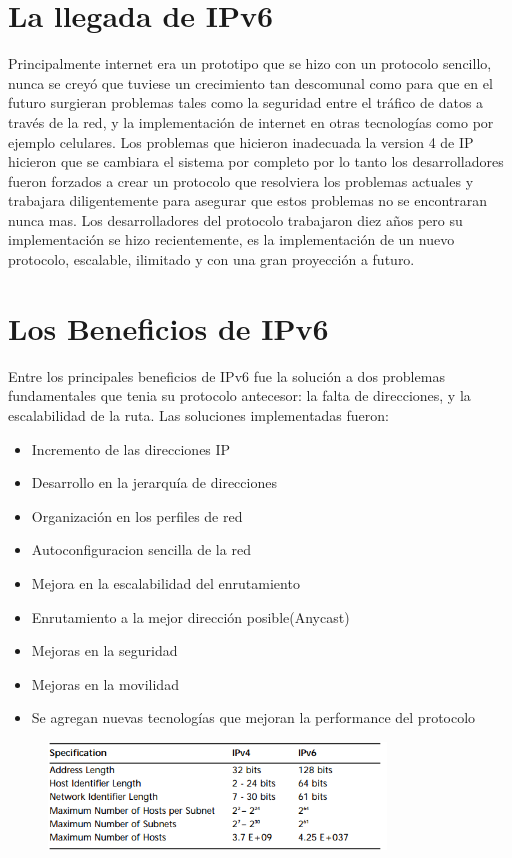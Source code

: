 \documentclass[11pt,a4paper]{article}
\begin{document}
\section{La llegada de IPv6}
Principalmente internet era un prototipo que se hizo con un protocolo sencillo, nunca se creyó que 
tuviese un crecimiento tan descomunal como para que en el futuro surgieran problemas tales como la 
seguridad entre el tráfico de datos a través de la red, y la implementación de internet en otras 
tecnologías como por ejemplo celulares. Los problemas que hicieron inadecuada la version 4 de IP 
hicieron que se cambiara el sistema por completo por lo tanto los desarrolladores fueron forzados a 
crear un protocolo que resolviera los problemas actuales y trabajara diligentemente para asegurar 
que estos problemas no se encontraran nunca mas. Los desarrolladores del protocolo trabajaron diez 
años pero su implementación se hizo recientemente, es la implementación de un nuevo protocolo, 
escalable, ilimitado y con una gran proyección a futuro.\par

\section{Los Beneficios de IPv6}
Entre los principales beneficios de IPv6 fue la solución a dos problemas fundamentales que tenia su 
protocolo antecesor: la falta de direcciones, y la escalabilidad de la ruta. Las soluciones 
implementadas fueron:
\begin{itemize}
\item Incremento de las direcciones IP
\item Desarrollo en la jerarquía de direcciones
\item Organización en los perfiles de red
\item Autoconfiguracion sencilla de la red
\item Mejora en la escalabilidad del enrutamiento
\item Enrutamiento a la mejor dirección posible(Anycast)
\item Mejoras en la seguridad
\item Mejoras en la movilidad
\item Se agregan nuevas tecnologías que mejoran la performance del protocolo

\end {itemize}
\begin{figure}[h!]
 \centering
 \includegraphics[width=0.8\textwidth]{comparativo_ip.png}
\end{figure} \par
\end{document}

